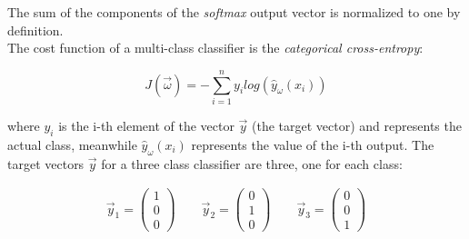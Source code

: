 The sum of the components of the \textit{softmax} output vector is normalized to one by definition.\\
The cost function of a multi-class classifier is the \textit{categorical cross-entropy}:

\begin{equation}
J(\vec{\omega}) = - \sum_{i=1}^{n} y_i log(\hat{y}_{\omega}(x_i))
\end{equation}


where $y_i$ is the i-th element of the vector $\vec{y}$ (the target vector) and represents the actual class, meanwhile $\hat{y}_{\omega}(x_i)$ represents the value of the i-th output.
The target vectors $\vec{y}$ for a three class classifier are three, one for each class:



\begin{align}
\vec{y}_1 = \begin{pmatrix}
1\\
0\\
0
\end{pmatrix}
\qquad
\vec{y}_2 = \begin{pmatrix}
0\\
1\\
0
\end{pmatrix}
\qquad
\vec{y}_3 =\begin{pmatrix}
0\\
0\\
1
\end{pmatrix}
\end{align}





